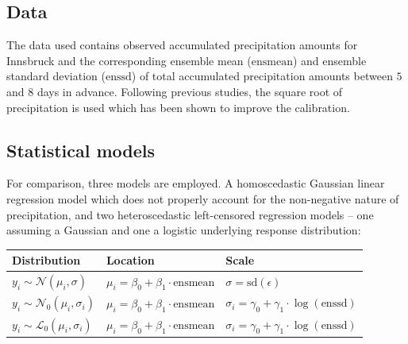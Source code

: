 \documentclass[twoside]{report}
\begin{document}
\subsection{Data}

The data used contains observed accumulated precipitation amounts for
Innsbruck and the corresponding ensemble mean ($\text{ensmean}$) and
ensemble standard deviation ($\text{enssd}$) of total accumulated precipitation amounts
between $5$ and $8$ days in advance.
Following previous studies, the square root of precipitation is used which has
been shown to improve the calibration.


\subsection{Statistical models}

For comparison, three models are employed. A homoscedastic Gaussian linear regression
model which does not properly account for the non-negative nature of precipitation,
and two heteroscedastic left-censored regression models --
one assuming a Gaussian and one a logistic underlying response distribution:

\begin{table}[!ht]\centering
    \begin{tabular}{lll}
         Distribution                              & Location                                         & Scale \\
        \midrule[0.09 em]
        $y_i \sim \mathcal{N}(\mu_i, \sigma)$     & $\mu_i = \beta_0 + \beta_1 \cdot \text{ensmean}$ & $\sigma = \text{sd}(\epsilon)$ \\
        $y_i \sim \mathcal{N}_0(\mu_i, \sigma_i)$ & $\mu_i = \beta_0 + \beta_1 \cdot \text{ensmean}$ & $\sigma_i = \gamma_0 + \gamma_1 \cdot \log(\text{enssd})$ \\
        $y_i \sim \mathcal{L}_0(\mu_i, \sigma_i)$ & $\mu_i = \beta_0 + \beta_1 \cdot \text{ensmean}$ & $\sigma_i = \gamma_0 + \gamma_1 \cdot \log(\text{enssd})$ \\
        \bottomrule[0.09 em]
    \end{tabular}
\end{table}
\end{document}
